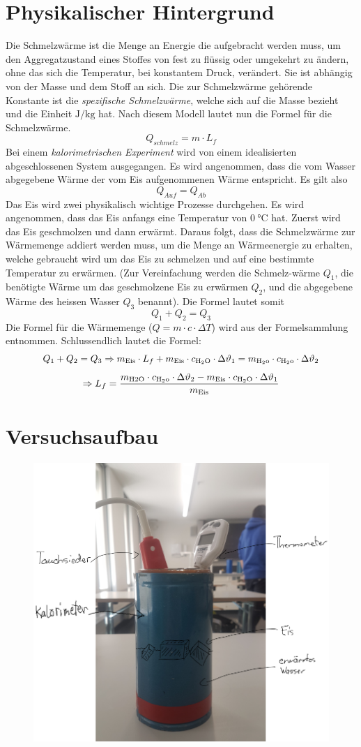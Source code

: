 \documentclass[a4paper,12pt]{article}
\begin{document}
\section{Physikalischer Hintergrund}
Die Schmelzwärme ist die Menge an Energie die aufgebracht werden muss, um den Aggregatzustand eines Stoffes von fest zu flüssig oder umgekehrt zu ändern, ohne das sich die Temperatur, bei konstantem Druck, verändert. Sie ist abhängig von der Masse und dem Stoff an sich. Die zur Schmelzwärme gehörende Konstante ist die \textit{spezifische Schmelzwärme}, welche sich auf die Masse bezieht und die Einheit $\si{\J\per\kg}$ hat. Nach diesem Modell lautet nun die Formel für die Schmelzwärme.
$$ Q_{schmelz}= m \cdot L_f$$
Bei einem \textit{kalorimetrischen Experiment} wird von einem idealisierten abgeschlossenen System ausgegangen. Es wird angenommen, dass die vom Wasser abgegebene Wärme der vom Eis aufgenommenen Wärme entspricht. Es gilt also
$$ Q_{Auf}=Q_{Ab}$$
Das Eis wird zwei physikalisch wichtige Prozesse durchgehen. Es wird angenommen, dass das Eis anfangs eine Temperatur von $\SI{0}{\celsius}$ hat. Zuerst wird das Eis geschmolzen und dann erwärmt. Daraus folgt, dass die Schmelzwärme zur Wärmemenge addiert werden muss, um die Menge an Wärmeenergie zu erhalten, welche gebraucht wird um das Eis zu schmelzen und auf eine bestimmte Temperatur zu erwärmen. (Zur Vereinfachung werden die Schmelz-wärme $Q_{1}$, die benötigte Wärme um das geschmolzene Eis zu erwärmen $Q_{2}$, und die abgegebene Wärme des heissen Wasser $Q_{3}$ benannt). Die Formel lautet somit
$$ Q_{1} + Q_{2} = Q_{3} $$
Die Formel für die Wärmemenge ($Q=m\cdot c\cdot \Delta T$) wird aus der Formelsammlung entnommen. Schlussendlich lautet die Formel:
$$ Q_{1} + Q_{2} = Q_{3} \Rightarrow m_{\rm{Eis}} \cdot L_f + m_{\rm{Eis}} \cdot c_{\rm{H_2O}} \cdot \Delta\vartheta_1 = m_{\rm{H_2o}} \cdot c_{\rm{H_2o}} \cdot \Delta\vartheta_2$$ $$ \Rightarrow L_f = \frac{m_{\rm{H2O}} \cdot c_{\rm{H_2o}} \cdot \Delta\vartheta_2 - m_{\rm{Eis}} \cdot c_{\rm{H_2O}} \cdot \Delta\vartheta_1}{m_{\rm{Eis}}}$$



\section{Versuchsaufbau}
\begin{figure}[H]
    \centering
    \includegraphics[width=.5\linewidth]{image}
\end{figure}
\end{document}
